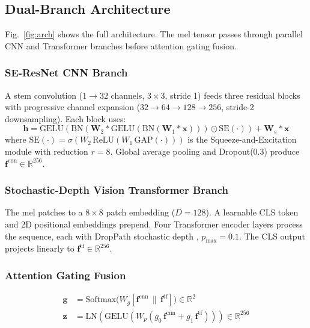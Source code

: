\documentclass[journal]{IEEEtran}
\newcommand{\R}{\mathbb{R}}
\begin{document}
\subsection{Dual-Branch Architecture}
\label{sec:arch}

Fig.~\ref{fig:arch} shows the full architecture. The mel tensor passes
through parallel CNN and Transformer branches before attention gating fusion.

\subsubsection{SE-ResNet CNN Branch}

A stem convolution ($1{\to}32$ channels, $3{\times}3$, stride 1)
feeds three residual blocks with progressive channel expansion
($32{\to}64{\to}128{\to}256$, stride-2 downsampling). Each block uses:
\begin{equation}
\mathbf{h} = \mathrm{GELU}(\mathrm{BN}(\mathbf{W}_2 * \mathrm{GELU}(\mathrm{BN}(\mathbf{W}_1 * \mathbf{x})))
             \odot \mathrm{SE}(\cdot)) + \mathbf{W}_s * \mathbf{x}
\label{eq:convblock}
\end{equation}
where $\mathrm{SE}(\cdot) = \sigma(W_2\,\mathrm{ReLU}(W_1\,\mathrm{GAP}(\cdot)))$
is the Squeeze-and-Excitation module \cite{se} with reduction $r{=}8$.
Global average pooling and Dropout(0.3) produce
$\mathbf{f}^\text{cnn}\in\R^{256}$.

\subsubsection{Stochastic-Depth Vision Transformer Branch}

The mel patches to a $8{\times}8$ patch embedding ($D{=}128$).
A learnable CLS token and 2D positional embeddings prepend.
Four Transformer encoder layers process the sequence, each with
DropPath stochastic depth \cite{stodepth}, $p_\text{max}{=}0.1$.
The CLS output projects linearly to $\mathbf{f}^\text{tf}\in\R^{256}$.

\subsubsection{Attention Gating Fusion}

\begin{align}
\mathbf{g} &= \mathrm{Softmax}\!\bigl(W_g[\mathbf{f}^\text{cnn}\,\|\,\mathbf{f}^\text{tf}]\bigr)
             \in\R^2 \label{eq:gate}\\
\mathbf{z} &= \mathrm{LN}(\mathrm{GELU}(W_p(g_0\,\mathbf{f}^\text{cnn} + g_1\,\mathbf{f}^\text{tf})))
             \in\R^{256} \label{eq:proj}
\end{align}
\end{document}
